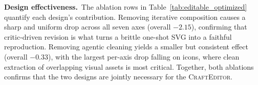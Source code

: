 \documentclass{llmxive}
\providecommand{\Editor}{\textsc{CraftEditor}\xspace}
\begin{document}
\noindent\textbf{Design effectiveness.}\ The ablation rows in Table~\ref{tab:editable_optimized} quantify each design's contribution. Removing iterative composition causes a sharp and uniform drop across all seven axes (overall $-2.15$), confirming that critic-driven revision is what turns a brittle one-shot SVG into a faithful reproduction. Removing agentic cleaning yields a smaller but consistent effect (overall $-0.33$), with the largest per-axis drop falling on icons, where clean extraction of overlapping visual assets is most critical. Together, both ablations confirms that the two designs are jointly necessary for the \Editor.


\end{document}
